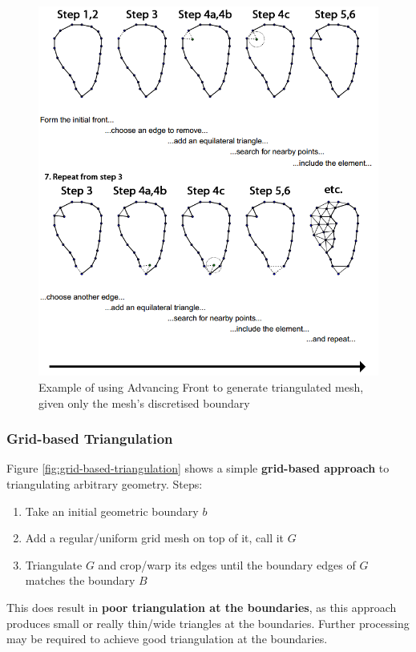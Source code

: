 \documentclass{article}
\begin{document}
\begin{figure}[H]
	\centering
	\includegraphics[scale=0.5]{figures/advancing-front-example.png}
	\caption{Example of using Advancing Front to generate triangulated mesh, given only the mesh's discretised boundary}
	\label{fig:advancing-front-example}
\end{figure}

\subsubsection{Grid-based Triangulation}

Figure \ref{fig:grid-based-triangulation} shows a simple \textbf{grid-based approach} to triangulating arbitrary geometry. Steps:
\begin{enumerate}
	\item Take an initial geometric boundary $b$
	\item Add a regular/uniform grid mesh on top of it, call it $G$
	\item Triangulate $G$ and crop/warp its edges until the boundary edges of $G$ matches the boundary $B$
\end{enumerate}
This does result in \textbf{poor triangulation at the boundaries}, as this approach produces small or really thin/wide triangles at the boundaries. Further processing may be required to achieve good triangulation at the boundaries.
\end{document}
